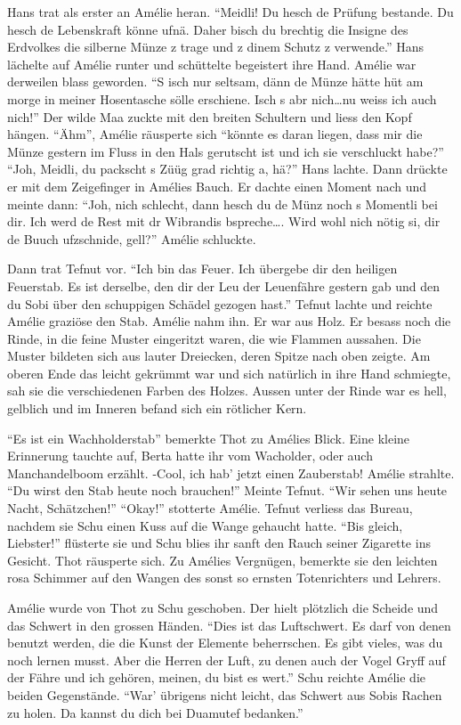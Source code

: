 \documentclass[11pt,titlepage,a5paper]{book}
\begin{document}
Hans trat als erster an Amélie heran. "`Meidli!  Du hesch de Prüfung bestande. Du hesch de Lebenskraft könne ufnä. Daher bisch du brechtig die Insigne des Erdvolkes die silberne Münze z trage und z dinem Schutz z verwende."' Hans lächelte auf Amélie runter und schüttelte begeistert ihre Hand. Amélie war derweilen blass geworden. "`S isch nur seltsam, dänn de Münze hätte hüt am morge in meiner Hosentasche sölle erschiene. Isch s abr nich\dots nu weiss ich auch nich!"' Der wilde Maa zuckte mit den breiten Schultern und liess den Kopf hängen. "`Ähm"', Amélie räusperte sich "`könnte es daran liegen, dass mir die Münze gestern im Fluss in den Hals gerutscht ist und ich sie verschluckt habe?"' "`Joh, Meidli, du packscht s Züüg grad richtig a, hä?"' Hans lachte. Dann drückte er mit dem Zeigefinger in Amélies Bauch. Er dachte einen Moment nach und meinte dann: "`Joh, nich schlecht, dann hesch du de Münz noch s Momentli bei dir. Ich werd de Rest mit dr Wibrandis bspreche\dots. Wird wohl nich nötig si, dir de Buuch ufzschnide, gell?"' Amélie schluckte.

Dann trat Tefnut vor. "`Ich bin das Feuer. Ich übergebe dir den heiligen Feuerstab. Es ist derselbe, den dir der Leu der Leuenfähre gestern gab und den du Sobi über den schuppigen Schädel gezogen hast."' Tefnut lachte und reichte Amélie graziöse den Stab. Amélie nahm ihn. Er war aus Holz. Er besass noch die Rinde, in die feine Muster eingeritzt waren, die wie Flammen aussahen. Die Muster bildeten sich aus lauter Dreiecken, deren Spitze nach oben zeigte. Am oberen Ende das leicht gekrümmt war und sich natürlich in ihre Hand schmiegte, sah sie die verschiedenen Farben des Holzes. Aussen unter der Rinde war es hell, gelblich und im Inneren befand sich ein rötlicher Kern.

 "`Es ist ein Wachholderstab"' bemerkte Thot zu Amélies Blick. Eine kleine Erinnerung tauchte auf, Berta hatte ihr vom Wacholder, oder auch Manchandelboom erzählt. -Cool, ich hab' jetzt einen Zauberstab! Amélie strahlte. "`Du wirst den Stab heute noch brauchen!"' Meinte Tefnut. "`Wir sehen uns heute Nacht, Schätzchen!"' "`Okay!"' stotterte Amélie. Tefnut verliess das Bureau, nachdem sie Schu einen Kuss auf die Wange gehaucht hatte. "`Bis gleich, Liebster!"' flüsterte sie und Schu blies ihr sanft den Rauch seiner Zigarette ins Gesicht. Thot räusperte sich. Zu Amélies Vergnügen, bemerkte sie den leichten rosa Schimmer auf den Wangen des sonst so ernsten Totenrichters und Lehrers.

Amélie wurde von Thot zu Schu geschoben. Der hielt plötzlich die Scheide und das Schwert in den grossen Händen. "`Dies ist das Luftschwert. Es darf von denen benutzt werden, die die Kunst der Elemente beherrschen. Es gibt vieles, was du noch lernen musst. Aber die Herren der Luft, zu denen auch der Vogel Gryff auf der Fähre und ich gehören, meinen, du bist es wert."' Schu reichte Amélie die beiden Gegenstände. "`War' übrigens nicht leicht, das Schwert aus Sobis Rachen zu holen. Da kannst du dich bei Duamutef bedanken."'
\end{document}

